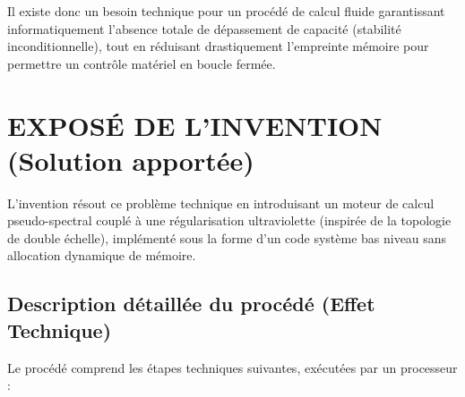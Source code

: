 \documentclass[11pt,a4paper]{article}
\begin{document}
Il existe donc un besoin technique pour un procédé de calcul fluide garantissant informatiquement l'absence totale de dépassement de capacité (stabilité inconditionnelle), tout en réduisant drastiquement l'empreinte mémoire pour permettre un contrôle matériel en boucle fermée.

\section{EXPOSÉ DE L'INVENTION (Solution apportée)}
L'invention résout ce problème technique en introduisant un moteur de calcul pseudo-spectral couplé à une régularisation ultraviolette (inspirée de la topologie de double échelle), implémenté sous la forme d'un code système bas niveau sans allocation dynamique de mémoire.

\subsection{Description détaillée du procédé (Effet Technique)}
Le procédé comprend les étapes techniques suivantes, exécutées par un processeur :
\end{document}
